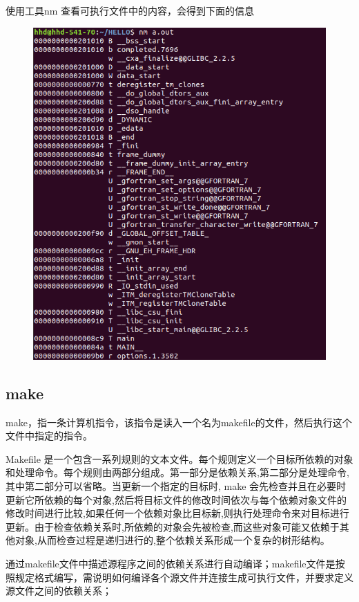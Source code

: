 \documentclass[12pt,a4paper]{article}
\begin{document}
使用工具nm 查看可执行文件中的内容，会得到下面的信息
\begin{figure}[H]
\centering
\includegraphics[scale=0.5]{./figures/32.png}
\caption{}
\end{figure}

\subsection{ make }
make，指一条计算机指令，该指令是读入一个名为makefile的文件，然后执行这个文件中指定的指令。

Makefile 是一个包含一系列规则的文本文件。每个规则定义一个目标所依赖的对象和处理命令。每个规则由两部分组成。第一部分是依赖关系,第二部分是处理命令,其中第二部分可以省略。当更新一个指定的目标时, make 会先检查并且在必要时更新它所依赖的每个对象,然后将目标文件的修改时间依次与每个依赖对象文件的修改时间进行比较,如果任何一个依赖对象比目标新,则执行处理命令来对目标进行更新。由于检查依赖关系时,所依赖的对象会先被检查,而这些对象可能又依赖于其他对象,从而检查过程是递归进行的,整个依赖关系形成一个复杂的树形结构。

通过makefile文件中描述源程序之间的依赖关系进行自动编译；makefile文件是按照规定格式编写，需说明如何编译各个源文件并连接生成可执行文件，并要求定义源文件之间的依赖关系； 
\end{document}
